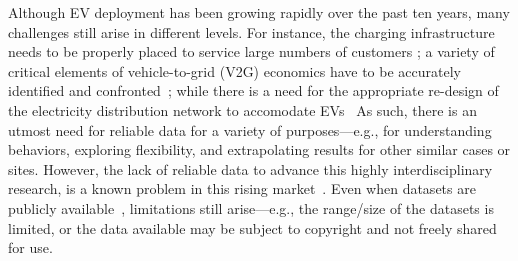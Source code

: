 \documentclass[sigconf]{acmart}
\begin{document}
Although EV deployment has been growing rapidly over the past ten years, many challenges still arise in different levels. 
For instance, the charging infrastructure needs to be properly placed to service large numbers of customers \cite{xiong2021electric}; a variety of critical elements of vehicle-to-grid (V2G) economics have to be accurately identified and confronted~\cite{steward2017critical}; while there is a need for the appropriate re-design of the electricity distribution network to accomodate EVs~\cite{flammini2017interaction}
As such, there is an utmost need for reliable data for a variety of purposes---e.g., for  understanding behaviors, exploring flexibility, and extrapolating results for other similar cases or sites. However, the lack of reliable data to advance this highly interdisciplinary research, is a known problem in this rising market~\cite{pevec2019electric}. Even 
when datasets are publicly available~\cite{barker2012smart,pecan}, limitations still arise---e.g., the range/size of the %
datasets is limited, or the data available may be subject to copyright and not freely shared for use.
\end{document}
